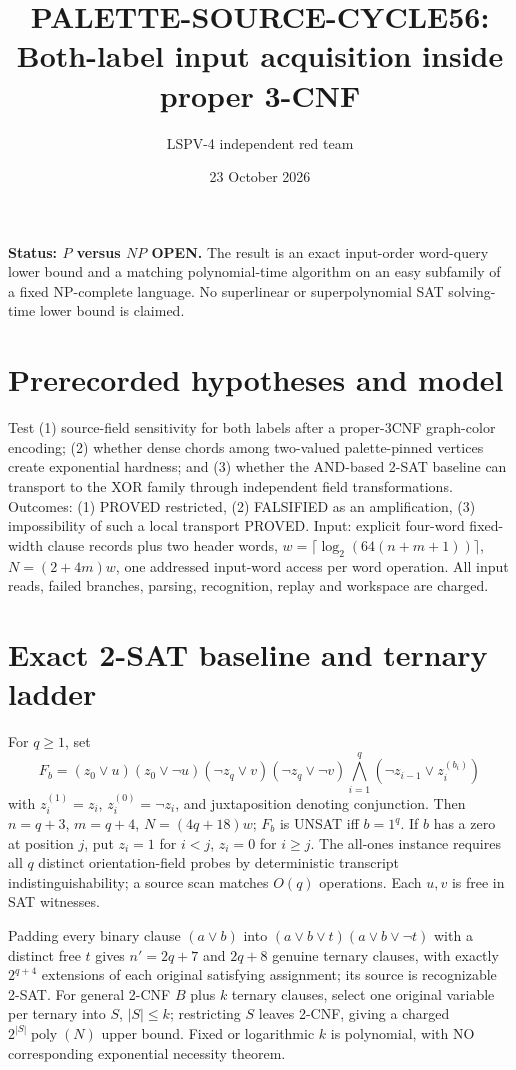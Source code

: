 \documentclass[11pt]{article}
\title{PALETTE-SOURCE-CYCLE56: Both-label input acquisition inside proper 3-CNF}
\author{LSPV-4 independent red team}
\date{23 October 2026}
\begin{document}
\maketitle
\noindent\textbf{Status: $P$ versus $NP$ OPEN.} The result is an exact input-order word-query lower bound and a matching polynomial-time algorithm on an easy subfamily of a fixed NP-complete language. No superlinear or superpolynomial SAT solving-time lower bound is claimed.

\section*{Prerecorded hypotheses and model}
Test (1) source-field sensitivity for both labels after a proper-3CNF graph-color encoding; (2) whether dense chords among two-valued palette-pinned vertices create exponential hardness; and (3) whether the AND-based 2-SAT baseline can transport to the XOR family through independent field transformations. Outcomes: (1) PROVED restricted, (2) FALSIFIED as an amplification, (3) impossibility of such a local transport PROVED. Input: explicit four-word fixed-width clause records plus two header words, $w=\lceil\log_2(64(n+m+1))\rceil$, $N=(2+4m)w$, one addressed input-word access per word operation. All input reads, failed branches, parsing, recognition, replay and workspace are charged.

\section*{Exact 2-SAT baseline and ternary ladder}
For $q\ge1$, set
\[
F_b=(z_0\vee u)(z_0\vee\neg u)(\neg z_q\vee v)(\neg z_q\vee\neg v)
\bigwedge_{i=1}^q (\neg z_{i-1}\vee z_i^{(b_i)})
\]
with $z_i^{(1)}=z_i$, $z_i^{(0)}=\neg z_i$, and juxtaposition denoting conjunction. Then $n=q+3$, $m=q+4$, $N=(4q+18)w$; $F_b$ is UNSAT iff $b=1^q$. If $b$ has a zero at position $j$, put $z_i=1$ for $i<j$, $z_i=0$ for $i\ge j$. The all-ones instance requires all $q$ distinct orientation-field probes by deterministic transcript indistinguishability; a source scan matches $O(q)$ operations. Each $u,v$ is free in SAT witnesses.

Padding every binary clause $(a\vee b)$ into $(a\vee b\vee t)(a\vee b\vee\neg t)$ with a distinct free $t$ gives $n'=2q+7$ and $2q+8$ genuine ternary clauses, with exactly $2^{q+4}$ extensions of each original satisfying assignment; its source is recognizable 2-SAT. For general 2-CNF $B$ plus $k$ ternary clauses, select one original variable per ternary into $S$, $|S|\le k$; restricting $S$ leaves 2-CNF, giving a charged $2^{|S|}\operatorname{poly}(N)$ upper bound. Fixed or logarithmic $k$ is polynomial, with NO corresponding exponential necessity theorem.
\end{document}
